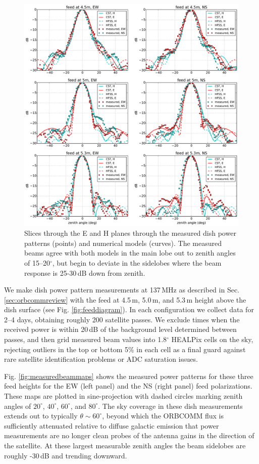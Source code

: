 \documentclass{emulateapj}
\begin{document}
\begin{figure}[t]
\centering
\includegraphics[width=6.5in]{measured_beams_and_models_slices.pdf}
\caption{Slices through the E and H planes through the measured dish power patterns (points) and numerical models (curves). The measured beams agree with both models in the main lobe out to zenith angles of 15--20$^\circ$, but begin to deviate in the sidelobes where the beam response is 25-30\,dB down from zenith.}
\label{fig:measuredbeamslices}
\end{figure}

We make dish power pattern measurements at 137\,MHz as described in Sec. \ref{sec:orbcommreview} with the feed at 4.5\,m, 5.0\,m, and 5.3\,m height above the dish surface (see Fig. \ref{fig:feeddiagram}). In each configuration we collect data for 2--4 days, obtaining roughly 200 satellite passes. We exclude times when the received power is within 20\,dB of the background level determined between passes, and then grid measured beam values into 1.8$^\circ$ HEALPix cells on the sky, rejecting outliers in the top or bottom 5\% in each cell as a final guard against rare satellite identification problems or ADC saturation issues.

Fig. \ref{fig:measuredbeammaps} shows the measured power patterns for these three feed heights for the EW (left panel) and the NS (right panel) feed polarizations. These maps are plotted in sine-projection with dashed circles marking zenith angles of $20^\circ$, $40^\circ$, $60^\circ$, and $80^\circ$. The sky coverage in these dish measurements extends out to typically $\theta\sim60^\circ$, beyond which the ORBCOMM flux is sufficiently attenuated relative to diffuse galactic emission that power measurements are no longer  clean probes of the antenna gains in the direction of the satellite. At these largest measurable zenith angles the beam sidelobes are roughly -30\,dB and trending downward. 
\end{document}
